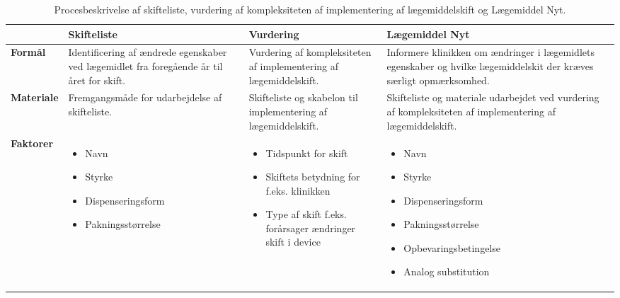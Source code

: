 \vspace{0.5cm}
\begin{table}[H]
\caption{Procesbeskrivelse af skifteliste, vurdering af kompleksiteten af implementering af lægemiddelskift og Lægemiddel Nyt.} 
\label{table:Proces}
\begin{tabular}{|p{1.8cm}|p{3.5cm}|p{3.5cm}|p{4.2cm}|} \hline
\cellcolor[HTML]{C0C0C0}\textbf{} & \cellcolor[HTML]{C0C0C0}\textbf{Skifteliste} & \cellcolor[HTML]{C0C0C0}\textbf{Vurdering} & \cellcolor[HTML]{C0C0C0}\textbf{Lægemiddel Nyt}\\ \hline
\cellcolor[HTML]{C0C0C0}\textbf{Formål} & Identificering af ændrede egenskaber ved lægemidlet fra foregående år til året for skift. & Vurdering af kompleksiteten af implementering af lægemiddelskift. & Informere klinikken om ændringer i lægemidlets egenskaber og hvilke lægemiddelskit der kræves særligt opmærksomhed. \\ \hline
\cellcolor[HTML]{C0C0C0}\textbf{Materiale} & Fremgangsmåde for udarbejdelse af skifteliste. & Skifteliste  og skabelon til implementering af lægemiddelskift. & Skifteliste og materiale udarbejdet ved vurdering af kompleksiteten af implementering af lægemiddelskift. \\ \hline
\cellcolor[HTML]{C0C0C0}\textbf{Faktorer} & \vspace{-0.2cm}\begin{itemize}[topsep=-0.5cm,leftmargin=0.3cm] \item Navn \item Styrke\item Dispenseringsform \item Pakningsstørrelse \end{itemize} & \vspace{-0.2cm}\begin{itemize}[topsep=-0.5cm,leftmargin=0.3cm] \item Tidspunkt for skift\item Skiftets betydning for f.eks. klinikken \item Type af skift f.eks. forårsager ændringer skift i device \end{itemize}  & \vspace{-0.2cm}\begin{itemize}[topsep=-0.5cm,leftmargin=0.3cm] \item Navn \item Styrke \item Dispenseringsform \item Pakningsstørrelse \item Opbevaringsbetingelse \item Analog substitution  \end{itemize} \\ \hline  
\end{tabular}
\end{table}

